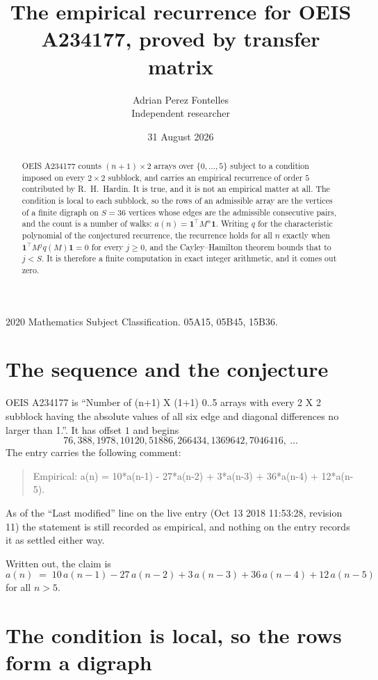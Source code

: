 \documentclass[11pt,a4paper]{article}
\title{The empirical recurrence for OEIS A234177, proved by transfer matrix}
\author{Adrian Perez Fontelles\\ \small Independent researcher}
\date{31 August 2026}
\theoremstyle{plain}
\theoremstyle{definition}
\begin{document}
\maketitle

\begin{abstract}
OEIS A234177 counts $(n+1)\times2$ arrays over $\{0,\dots,5\}$ subject to a condition imposed on
every $2\times2$ subblock, and carries an empirical recurrence of order $5$ contributed
by R.~H.~Hardin. It is true, and it is not an empirical matter at all. The condition is local
to each subblock, so the rows of an admissible array are the vertices of a finite digraph
on $S=36$ vertices whose edges are the admissible consecutive pairs, and the count is a
number of walks: $a(n)=\mathbf{1}^{\!\top}M^{n}\mathbf{1}$. Writing $q$
for the characteristic polynomial of the conjectured recurrence, the recurrence holds for all
$n$ exactly when $\mathbf{1}^{\!\top}M^{j}q(M)\mathbf{1}=0$ for every $j\ge0$, and the
Cayley--Hamilton theorem bounds that to $j<S$. It is therefore a finite computation in exact
integer arithmetic, and it comes out zero.
\end{abstract}

\noindent\small 2020 Mathematics Subject Classification. 05A15, 05B45, 15B36.\normalsize

\section{The sequence and the conjecture}

OEIS A234177 is ``Number of (n+1) X (1+1) 0..5 arrays with every 2 X 2 subblock having the absolute values of all six edge and diagonal differences no larger than 1.''. It has offset $1$ and begins
\[
76, 388, 1978, 10120, 51886, 266434, 1369642, 7046416,\ \dots
\]
The entry carries the following comment:
\begin{quote}\small
Empirical: a(n) = 10*a(n-1) - 27*a(n-2) + 3*a(n-3) + 36*a(n-4) + 12*a(n-5).
\end{quote}
As of the ``Last modified'' line on the live entry (Oct 13 2018 11:53:28, revision 11) the statement is
still recorded as empirical, and nothing on the entry records it as settled either way.

Written out, the claim is
\begin{equation}\label{eq:conj}
a(n)\;=\;10\,a(n-1) - 27\,a(n-2) + 3\,a(n-3) + 36\,a(n-4) + 12\,a(n-5)
\end{equation}
for all $n>5$.

\section{The condition is local, so the rows form a digraph}
\end{document}
